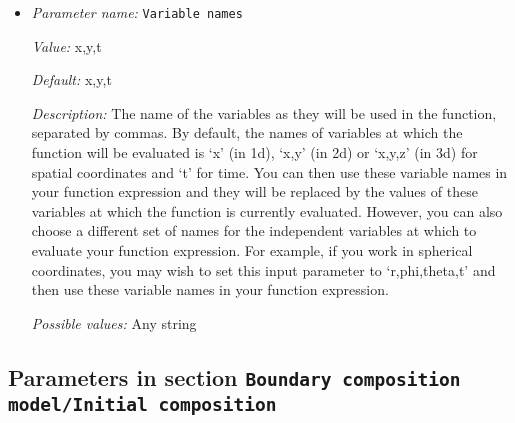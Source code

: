 \begin{itemize}
{\it Value:} 0


{\it Default:} 0


{\it Description:} The formula that denotes the function you want to evaluate for particular values of the independent variables. This expression may contain any of the usual operations such as addition or multiplication, as well as all of the common functions such as `sin' or `cos'. In addition, it may contain expressions like `if(x>0, 1, -1)' where the expression evaluates to the second argument if the first argument is true, and to the third argument otherwise. For a full overview of possible expressions accepted see the documentation of the muparser library at http://muparser.beltoforion.de/.

If the function you are describing represents a vector-valued function with multiple components, then separate the expressions for individual components by a semicolon.


{\it Possible values:} Any string
\item {\it Parameter name:} {\tt Variable names}
\label{parameters:Boundary composition model/Function/Variable names}


{\it Value:} x,y,t


{\it Default:} x,y,t


{\it Description:} The name of the variables as they will be used in the function, separated by commas. By default, the names of variables at which the function will be evaluated is `x' (in 1d), `x,y' (in 2d) or `x,y,z' (in 3d) for spatial coordinates and `t' for time. You can then use these variable names in your function expression and they will be replaced by the values of these variables at which the function is currently evaluated. However, you can also choose a different set of names for the independent variables at which to evaluate your function expression. For example, if you work in spherical coordinates, you may wish to set this input parameter to `r,phi,theta,t' and then use these variable names in your function expression.


{\it Possible values:} Any string
\end{itemize}

\subsection{Parameters in section \tt Boundary composition model/Initial composition}
\label{parameters:Boundary_20composition_20model/Initial_20composition}

